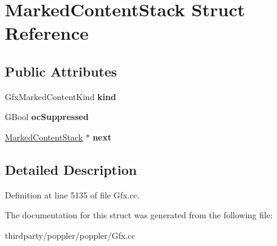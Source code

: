 \hypertarget{struct_marked_content_stack}{}\section{Marked\+Content\+Stack Struct Reference}
\label{struct_marked_content_stack}
\subsection*{Public Attributes}
\begin{DoxyCompactItemize}
\item 
\mbox{\label{struct_marked_content_stack_a89c2475ca0d46fda8363d724e5f1b839}} 
Gfx\+Marked\+Content\+Kind {\bfseries kind}
\item 
\mbox{\label{struct_marked_content_stack_ae7e8db410e31a0e7d7507e999e0db21a}} 
G\+Bool {\bfseries oc\+Suppressed}
\item 
\mbox{\label{struct_marked_content_stack_ac55880e7a5918d84eabb438b71f0770d}} 
\hyperlink{struct_marked_content_stack}{Marked\+Content\+Stack} $\ast$ {\bfseries next}
\end{DoxyCompactItemize}


\subsection{Detailed Description}


Definition at line 5135 of file Gfx.\+cc.



The documentation for this struct was generated from the following file\+:\begin{DoxyCompactItemize}
\item 
thirdparty/poppler/poppler/Gfx.\+cc\end{DoxyCompactItemize}
